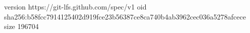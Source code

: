 version https://git-lfs.github.com/spec/v1
oid sha256:b58fcc7914125402d919fce23b56387ce8ca740b4ab3962cec036a5278afcece
size 196704
